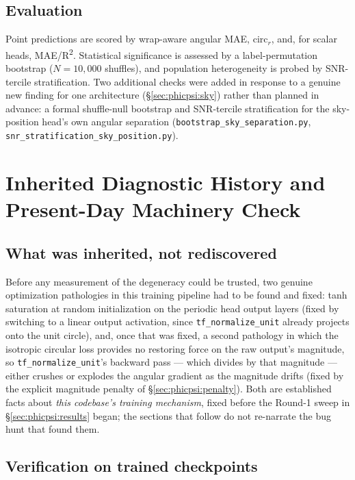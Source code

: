 \subsection{Evaluation}
\label{sec:phicpsi:evaluation}

Point predictions are scored by wrap-aware angular MAE, $\text{circ}_r$, and, for scalar heads, MAE/R\textsuperscript{2}.
Statistical significance is assessed by a label-permutation bootstrap ($N=10{,}000$ shuffles), and population heterogeneity is probed by SNR-tercile stratification.
Two additional checks were added in response to a genuine new finding for one architecture (\S\ref{sec:phicpsi:sky}) rather than planned in advance: a formal shuffle-null bootstrap and SNR-tercile stratification for the sky-position head's own angular separation (\texttt{bootstrap\_sky\_separation.py}, \texttt{snr\_stratification\_sky\_position.py}).


\section{Inherited Diagnostic History and Present-Day Machinery Check}
\label{sec:phicpsi:arc}

\subsection{What was inherited, not rediscovered}
\label{sec:phicpsi:inherited}

Before any measurement of the degeneracy could be trusted, two genuine optimization pathologies in this training pipeline had to be found and fixed: tanh saturation at random initialization on the periodic head output layers (fixed by switching to a linear output activation, since \texttt{tf\_normalize\_unit} already projects onto the unit circle), and, once that was fixed, a second pathology in which the isotropic circular loss provides no restoring force on the raw output's magnitude, so \texttt{tf\_normalize\_unit}'s backward pass --- which divides by that magnitude --- either crushes or explodes the angular gradient as the magnitude drifts (fixed by the explicit magnitude penalty of \S\ref{sec:phicpsi:penalty}).
Both are established facts about \emph{this codebase's training mechanism}, fixed before the Round-1 sweep in \S\ref{sec:phicpsi:results} began; the sections that follow do not re-narrate the bug hunt that found them.

\subsection{Verification on trained checkpoints}
\label{sec:phicpsi:verification}

